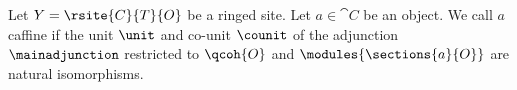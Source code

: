 \begin{definition}
Let $Y = \rsite{C}{T}{O}$ be a ringed site.
Let $a\in \cat{C}$ be an object. 
We call $a$ caffine
if the unit $\unit$
and co-unit $\counit$ 
of the adjunction $\mainadjunction$
restricted to $\qcoh{O}$ and $\modules{\sections{a}{O}}$ 
are natural isomorphisms.
\end{definition}